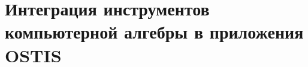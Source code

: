 \chapter{Интеграция инструментов компьютерной алгебры в приложения OSTIS}
\label{chapter_comp_algebra}



%